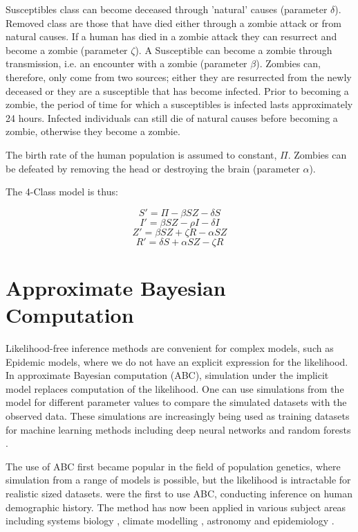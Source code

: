 \documentclass[]{article}
\begin{document}
Susceptibles class can become deceased through 'natural' causes (parameter $\delta$). Removed class are those that have died either through a zombie attack or from natural causes. If a human has died in a zombie attack they can resurrect and become a zombie (parameter $\zeta$). A Susceptible can become a zombie through transmission, i.e. an encounter with a zombie (parameter $\beta$). Zombies can, therefore, only come from two sources; either they are resurrected from the newly deceased or they are a susceptible that has become infected. Prior to becoming a zombie, the period of time for which a susceptibles is infected lasts approximately 24 hours. Infected individuals can still die of natural causes before becoming a zombie, otherwise they become a zombie.

The birth rate of the human population is assumed to constant, $\Pi$. Zombies can be defeated by removing the head or destroying the brain (parameter $\alpha$). 

The 4-Class model is thus:

\[S' = \Pi - \beta SZ - \delta S\]
\[I' = \beta SZ - \rho I - \delta I\]
\[Z' = \beta SZ + \zeta R - \alpha SZ\]
\[R' = \delta S + \alpha SZ - \zeta R\]

\section{Approximate Bayesian Computation}

Likelihood-free inference methods are convenient for complex models, such as Epidemic models, where we do not have an explicit expression for the likelihood. In approximate Bayesian computation (ABC), simulation under the implicit model replaces computation of the likelihood. One can use simulations from the model for different parameter values to compare the simulated datasets with the observed data. These simulations are increasingly being used as training datasets for machine learning methods including deep neural networks \citep{RN6} and random forests \citep{RN8}. 

The use of ABC first became popular in the field of population genetics, where simulation from a range of models is possible, but the likelihood is intractable for realistic sized datasets. \cite{RN57} were the first to use ABC, conducting inference on human demographic history. The method has now been applied in various subject areas including systems biology \citep{RN60}, climate modelling \citep{RN61}, astronomy \citep{RN62} and epidemiology \citep{RN10}.
\end{document}
